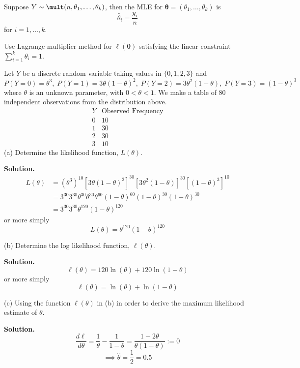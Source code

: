 \begin{Proposition}{}{}
    Suppose $ Y \sim \mult(n,\theta_1,\ldots ,\theta_k) $, then the MLE for
    $ \symbf{\theta}=(\theta_1,\ldots ,\theta_k) $ is
    \[ \hat{\theta}_i=\frac{y_i}{n} \]
    for $ i=1,\ldots ,k $.
\end{Proposition}

\begin{Proof}{}{}
    Use Lagrange multiplier method for $ \ell(\symbf{\theta}) $ satisfying the linear
    constraint $ \sum\limits_{i=1}^{k} \theta_i=1 $.
\end{Proof}


\begin{Example}{}{}
    Let $ Y $ be a discrete random variable taking values in $ \{0,1,2,3\} $ and
    \[ P(Y=0)=\theta^3,\; P(Y=1)=3\theta(1-\theta)^2,\;P(Y=2)=3\theta^2(1-\theta),\;
        P(Y=3)=(1-\theta)^3 \]
    where $ \theta $ is an unknown parameter, with $ 0<\theta<1 $.
    We make a table of $ 80 $ independent observations from the distribution above.
    \[
        \begin{array}{c|c}
            Y & \text{Observed Frequency} \\
            \hline
            0 & 10                        \\
            1 & 30                        \\
            2 & 30                        \\
            3 & 10
        \end{array}
    \]
    (a) Determine the likelihood function, $ L(\theta) $.

    \textbf{Solution.}
    \begin{align*}
        L(\theta)
         & =\left( \theta^3 \right)^{10}\left[ 3\theta(1-\theta)^2 \right]^{30}
        \left[ 3\theta^2(1-\theta) \right]^{30}\left[ (1-\theta)^3 \right]^{10}                        \\
         & =3^{30}3^{30}\theta^{30}\theta^{30}\theta^{60}(1-\theta)^{60}(1-\theta)^{30}(1-\theta)^{30} \\
         & =3^{30}3^{30}\theta^{120}(1-\theta)^{120}
    \end{align*}
    or more simply
    \[ L(\theta)=\theta^{120}(1-\theta)^{120} \]

    (b) Determine the log likelihood function, $ \ell(\theta) $.

    \textbf{Solution.}
    \[ \ell(\theta)=120\ln(\theta)+120\ln(1-\theta) \]
    or more simply
    \[ \ell(\theta)=\ln(\theta)+\ln(1-\theta) \]

    (c) Using the function $ \ell(\theta) $ in (b) in order to derive the maximum
    likelihood estimate of $ \theta $.

    \textbf{Solution.}
    \[ \frac{d\ell}{d\theta}=\frac{1}{\theta}-\frac{1}{1-\theta}=\frac{1-2\theta}{\theta(1-\theta)}:=0 \]
    \[ \implies \hat{\theta}=\frac{1}{2}=0.5 \]
\end{Example}



